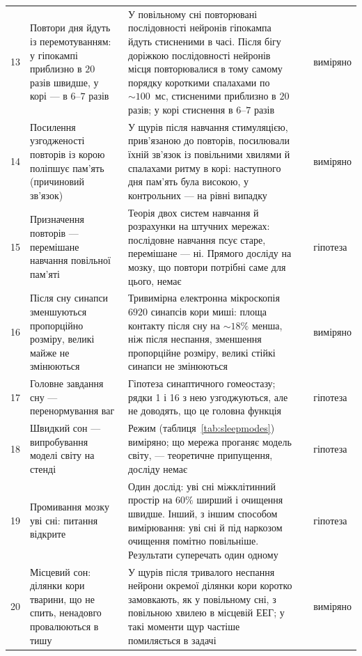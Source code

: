{\begin{longtable}{>{\raggedright}p{0.5cm}>{\raggedright}p{4.0cm}>{\raggedright}p{5.6cm}>{\raggedright}p{2.3cm}>{\raggedright\arraybackslash}p{1.7cm}}
13 & Повтори дня йдуть із перемотуванням: у гіпокампі приблизно в $20$ разів швидше, у корі --- в $6$--$7$ разів & У повільному сні повторювані послідовності нейронів гіпокампа йдуть стисненими в часі. Після бігу доріжкою послідовності нейронів місця повторювалися в тому самому порядку короткими спалахами по $\sim100$~мс, стисненими приблизно в $20$ разів; у корі стиснення в $6$--$7$ разів & \cite{Nadasdy1999,LeeWilson2002,Euston2007} & виміряно \\
14 & Посилення узгодженості повторів із корою поліпшує пам'ять (причиновий зв'язок) & У щурів після навчання стимуляцією, прив'язаною до повторів, посилювали їхній зв'язок із повільними хвилями й спалахами ритму в корі: наступного дня пам'ять була високою, у контрольних --- на рівні випадку & \cite{Maingret2016} & виміряно \\
15 & Призначення повторів --- перемішане навчання повільної пам'яті & Теорія двох систем навчання й розрахунки на штучних мережах: послідовне навчання псує старе, перемішане --- ні. Прямого досліду на мозку, що повтори потрібні саме для цього, немає & \cite{McClelland1995} & гіпотеза \\
16 & Після сну синапси зменшуються пропорційно розміру, великі майже не змінюються & Тривимірна електронна мікроскопія $6920$ синапсів кори миші: площа контакту після сну на $\sim18\%$ менша, ніж після неспання, зменшення пропорційне розміру, великі стійкі синапси не змінюються & \cite{deVivo2017} & виміряно \\
17 & Головне завдання сну --- перенормування ваг & Гіпотеза синаптичного гомеостазу; рядки 1 і 16 з нею узгоджуються, але не доводять, що це головна функція & \cite{TononiCirelli2014} & гіпотеза \\
18 & Швидкий сон --- випробування моделі світу на стенді & Режим (таблиця~\ref{tab:sleepmodes}) виміряно; що мережа проганяє модель світу, --- теоретичне припущення, досліду немає & \cite{Hobson2009} & гіпотеза \\
19 & Промивання мозку уві сні: питання відкрите & Один дослід: уві сні міжклітинний простір на $60\%$ ширший і очищення швидше. Інший, з іншим способом вимірювання: уві сні й під наркозом очищення помітно повільніше. Результати суперечать один одному & \cite{Xie2013,Miao2024} & гіпотеза \\
20 & Місцевий сон: ділянки кори тварини, що не спить, ненадовго провалюються в тишу & У щурів після тривалого неспання нейрони окремої ділянки кори коротко замовкають, як у повільному сні, з повільною хвилею в місцевій ЕЕГ; у такі моменти щур частіше помиляється в задачі & \cite{Vyazovskiy2011} & виміряно \\
\bottomrule
\end{longtable}}
